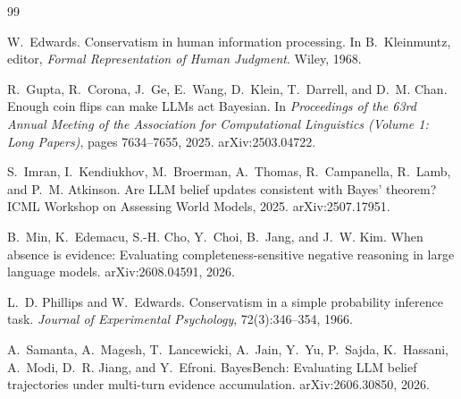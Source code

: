 \documentclass{article}
\theoremstyle{plain}
\theoremstyle{definition}
\theoremstyle{remark}
\begin{document}
\begin{thebibliography}{99}

W.~Edwards.
\newblock Conservatism in human information processing.
\newblock In B.~Kleinmuntz, editor, \emph{Formal Representation of Human
  Judgment}. Wiley, 1968.

R.~Gupta, R.~Corona, J.~Ge, E.~Wang, D.~Klein, T.~Darrell, and D.~M. Chan.
\newblock Enough coin flips can make LLMs act Bayesian.
\newblock In \emph{Proceedings of the 63rd Annual Meeting of the Association
  for Computational Linguistics (Volume 1: Long Papers)}, pages 7634--7655,
  2025. arXiv:2503.04722.

S.~Imran, I.~Kendiukhov, M.~Broerman, A.~Thomas, R.~Campanella, R.~Lamb, and
  P.~M. Atkinson.
\newblock Are LLM belief updates consistent with Bayes' theorem?
\newblock ICML Workshop on Assessing World Models, 2025. arXiv:2507.17951.

B.~Min, K.~Edemacu, S.-H. Cho, Y.~Choi, B.~Jang, and J.~W. Kim.
\newblock When absence is evidence: Evaluating completeness-sensitive negative
  reasoning in large language models.
\newblock arXiv:2608.04591, 2026.

L.~D. Phillips and W.~Edwards.
\newblock Conservatism in a simple probability inference task.
\newblock \emph{Journal of Experimental Psychology}, 72(3):346--354, 1966.

A.~Samanta, A.~Magesh, T.~Lancewicki, A.~Jain, Y.~Yu, P.~Sajda, K.~Hassani,
  A.~Modi, D.~R. Jiang, and Y.~Efroni.
\newblock BayesBench: Evaluating LLM belief trajectories under multi-turn
  evidence accumulation.
\newblock arXiv:2606.30850, 2026.

\end{thebibliography}
\end{document}
